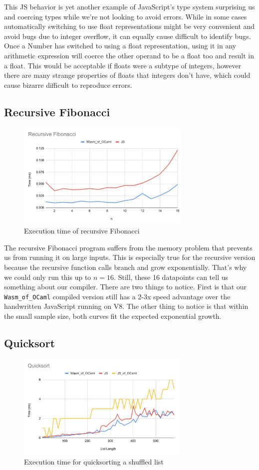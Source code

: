 \documentclass[12pt,a4paper,twoside,openright]{report}
\begin{document}
This JS behavior is yet another example of JavaScript's type system surprising us and coercing types while we're not looking to avoid errors.
While in some cases automatically switching to use float representations might be very convenient and avoid bugs due to integer overflow, it can equally cause difficult to identify bugs.
Once a Number has switched to using a float representation, using it in any arithmetic expression will coerce the other operand to be a float too and result in a float.
This would be acceptable if floats were a subtype of integers, however there are many strange properties of floats that integers don't have, which could cause bizarre difficult to reproduce errors.

\subsection{Recursive Fibonacci}
\begin{figure}[tbh]
\centerline{\includegraphics[height=2in]{fib-rec-graph}}
\caption{Execution time of recursive Fibonacci}
\label{fib-rec-graph}
\end{figure}
The recursive Fibonacci program suffers from the memory problem that prevents us from running it on large inputs.
This is especially true for the recursive version because the recursive function calls branch and grow exponentially.
That's why we could only run this up to $n=16$.
Still, these 16 datapoints can tell us something about our compiler.
There are two things to notice.
First is that our {\tt Wasm\_of\_OCaml} compiled version still has a 2-3x speed advantage over the handwritten JavaScript running on V8.
The other thing to notice is that within the small sample size, both curves fit the expected exponential growth.

\subsection{Quicksort}
\begin{figure}[tbh]
\centerline{\includegraphics[height=2in]{quicksort-graph}}
\caption{Execution time for quicksorting a shuffled list}
\label{quicksort-graph}
\end{figure}
\end{document}

